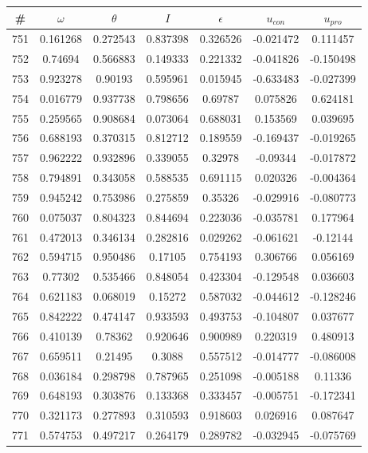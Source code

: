 \newpage
\begin{table}
\begin{tabular}{c|c|c|c|c|c|c}
\# & $\omega$ & $\theta$ & $I$ & $\epsilon$ & $u_{con}$ & $u_{pro}$\\
\hline
751 & 0.161268 & 0.272543 & 0.837398 & 0.326526 & -0.021472 & 0.111457\\
752 & 0.74694 & 0.566883 & 0.149333 & 0.221332 & -0.041826 & -0.150498\\
753 & 0.923278 & 0.90193 & 0.595961 & 0.015945 & -0.633483 & -0.027399\\
754 & 0.016779 & 0.937738 & 0.798656 & 0.69787 & 0.075826 & 0.624181\\
755 & 0.259565 & 0.908684 & 0.073064 & 0.688031 & 0.153569 & 0.039695\\
756 & 0.688193 & 0.370315 & 0.812712 & 0.189559 & -0.169437 & -0.019265\\
757 & 0.962222 & 0.932896 & 0.339055 & 0.32978 & -0.09344 & -0.017872\\
758 & 0.794891 & 0.343058 & 0.588535 & 0.691115 & 0.020326 & -0.004364\\
759 & 0.945242 & 0.753986 & 0.275859 & 0.35326 & -0.029916 & -0.080773\\
760 & 0.075037 & 0.804323 & 0.844694 & 0.223036 & -0.035781 & 0.177964\\
761 & 0.472013 & 0.346134 & 0.282816 & 0.029262 & -0.061621 & -0.12144\\
762 & 0.594715 & 0.950486 & 0.17105 & 0.754193 & 0.306766 & 0.056169\\
763 & 0.77302 & 0.535466 & 0.848054 & 0.423304 & -0.129548 & 0.036603\\
764 & 0.621183 & 0.068019 & 0.15272 & 0.587032 & -0.044612 & -0.128246\\
765 & 0.842222 & 0.474147 & 0.933593 & 0.493753 & -0.104807 & 0.037677\\
766 & 0.410139 & 0.78362 & 0.920646 & 0.900989 & 0.220319 & 0.480913\\
767 & 0.659511 & 0.21495 & 0.3088 & 0.557512 & -0.014777 & -0.086008\\
768 & 0.036184 & 0.298798 & 0.787965 & 0.251098 & -0.005188 & 0.11336\\
769 & 0.648193 & 0.303876 & 0.133368 & 0.333457 & -0.005751 & -0.172341\\
770 & 0.321173 & 0.277893 & 0.310593 & 0.918603 & 0.026916 & 0.087647\\
771 & 0.574753 & 0.497217 & 0.264179 & 0.289782 & -0.032945 & -0.075769\\

\end{tabular}
\end{table}
